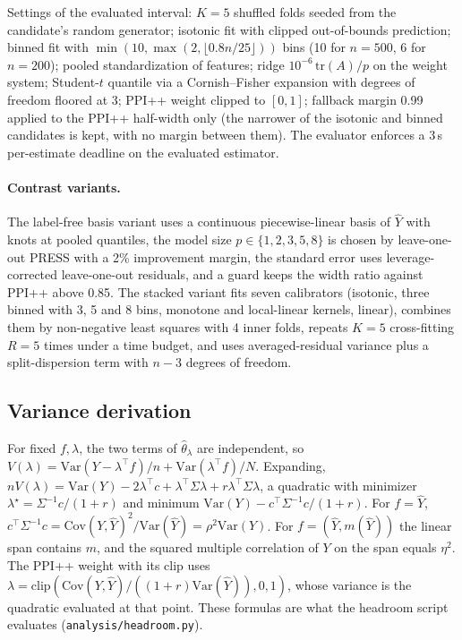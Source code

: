 \documentclass{article}
\newcommand{\Yhat}{\hat Y}
\newcommand{\Var}{\mathrm{Var}}
\newcommand{\Cov}{\mathrm{Cov}}
\begin{document}
Settings of the evaluated interval: $K=5$ shuffled folds seeded from the candidate's random generator; isotonic fit with clipped out-of-bounds prediction; binned fit with $\min(10,\max(2,\lfloor 0.8n/25\rfloor))$ bins (10 for $n=500$, 6 for $n=200$); pooled standardization of features; ridge $10^{-6}\,\mathrm{tr}(A)/p$ on the weight system; Student-$t$ quantile via a Cornish--Fisher expansion with degrees of freedom floored at 3; PPI++ weight clipped to $[0,1]$; fallback margin 0.99 applied to the PPI++ half-width only (the narrower of the isotonic and binned candidates is kept, with no margin between them). The evaluator enforces a 3\,s per-estimate deadline on the evaluated estimator.

\paragraph{Contrast variants.} The label-free basis variant uses a continuous piecewise-linear basis of $\Yhat$ with knots at pooled quantiles, the model size $p\in\{1,2,3,5,8\}$ is chosen by leave-one-out PRESS with a 2\% improvement margin, the standard error uses leverage-corrected leave-one-out residuals, and a guard keeps the width ratio against PPI++ above 0.85. The stacked variant fits seven calibrators (isotonic, three binned with 3, 5 and 8 bins, monotone and local-linear kernels, linear), combines them by non-negative least squares with 4 inner folds, repeats $K=5$ cross-fitting $R=5$ times under a time budget, and uses averaged-residual variance plus a split-dispersion term with $n-3$ degrees of freedom.

\subsection{Variance derivation}\label{sec:si-deriv}
For fixed $f,\lambda$, the two terms of $\hat\theta_\lambda$ are independent, so $V(\lambda)=\Var(Y-\lambda^\top f)/n+\Var(\lambda^\top f)/N$. Expanding, $nV(\lambda)=\Var(Y)-2\lambda^\top c+\lambda^\top\Sigma\lambda+r\lambda^\top\Sigma\lambda$, a quadratic with minimizer $\lambda^\star=\Sigma^{-1}c/(1+r)$ and minimum $\Var(Y)-c^\top\Sigma^{-1}c/(1+r)$. For $f=\Yhat$, $c^\top\Sigma^{-1}c=\Cov(Y,\Yhat)^2/\Var(\Yhat)=\rho^2\Var(Y)$. For $f=(\Yhat,m(\Yhat))$ the linear span contains $m$, and the squared multiple correlation of $Y$ on the span equals $\eta^2$. The PPI++ weight with its clip uses $\lambda=\mathrm{clip}(\Cov(Y,\Yhat)/((1+r)\Var(\Yhat)),0,1)$, whose variance is the quadratic evaluated at that point. These formulas are what the headroom script evaluates (\texttt{analysis/headroom.py}).
\end{document}
